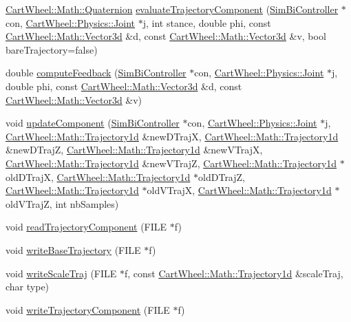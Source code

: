 \begin{DoxyCompactItemize}
\item 
\hyperlink{classCartWheel_1_1Math_1_1Quaternion}{CartWheel::Math::Quaternion} \hyperlink{classCartWheel_1_1Core_1_1TrajectoryComponent_afefb087422e56e30397225216fb2444a}{evaluateTrajectoryComponent} (\hyperlink{classCartWheel_1_1Core_1_1SimBiController}{SimBiController} $\ast$con, \hyperlink{classCartWheel_1_1Physics_1_1Joint}{CartWheel::Physics::Joint} $\ast$j, int stance, double phi, const \hyperlink{classCartWheel_1_1Math_1_1Vector3d}{CartWheel::Math::Vector3d} \&d, const \hyperlink{classCartWheel_1_1Math_1_1Vector3d}{CartWheel::Math::Vector3d} \&v, bool bareTrajectory=false)
\item 
double \hyperlink{classCartWheel_1_1Core_1_1TrajectoryComponent_a7708f478d9116878361a321bfb907558}{computeFeedback} (\hyperlink{classCartWheel_1_1Core_1_1SimBiController}{SimBiController} $\ast$con, \hyperlink{classCartWheel_1_1Physics_1_1Joint}{CartWheel::Physics::Joint} $\ast$j, double phi, const \hyperlink{classCartWheel_1_1Math_1_1Vector3d}{CartWheel::Math::Vector3d} \&d, const \hyperlink{classCartWheel_1_1Math_1_1Vector3d}{CartWheel::Math::Vector3d} \&v)
\item 
void \hyperlink{classCartWheel_1_1Core_1_1TrajectoryComponent_a3771a3d28d488a93d44f3bc71c1162b9}{updateComponent} (\hyperlink{classCartWheel_1_1Core_1_1SimBiController}{SimBiController} $\ast$con, \hyperlink{classCartWheel_1_1Physics_1_1Joint}{CartWheel::Physics::Joint} $\ast$j, \hyperlink{classCartWheel_1_1Math_1_1GenericTrajectory}{CartWheel::Math::Trajectory1d} \&newDTrajX, \hyperlink{classCartWheel_1_1Math_1_1GenericTrajectory}{CartWheel::Math::Trajectory1d} \&newDTrajZ, \hyperlink{classCartWheel_1_1Math_1_1GenericTrajectory}{CartWheel::Math::Trajectory1d} \&newVTrajX, \hyperlink{classCartWheel_1_1Math_1_1GenericTrajectory}{CartWheel::Math::Trajectory1d} \&newVTrajZ, \hyperlink{classCartWheel_1_1Math_1_1GenericTrajectory}{CartWheel::Math::Trajectory1d} $\ast$oldDTrajX, \hyperlink{classCartWheel_1_1Math_1_1GenericTrajectory}{CartWheel::Math::Trajectory1d} $\ast$oldDTrajZ, \hyperlink{classCartWheel_1_1Math_1_1GenericTrajectory}{CartWheel::Math::Trajectory1d} $\ast$oldVTrajX, \hyperlink{classCartWheel_1_1Math_1_1GenericTrajectory}{CartWheel::Math::Trajectory1d} $\ast$oldVTrajZ, int nbSamples)
\item 
void \hyperlink{classCartWheel_1_1Core_1_1TrajectoryComponent_ae6df1efc43d8cb573b3dfa0493e491cf}{readTrajectoryComponent} (FILE $\ast$f)
\item 
void \hyperlink{classCartWheel_1_1Core_1_1TrajectoryComponent_aeb954304d3c81830f2b543b159e889d7}{writeBaseTrajectory} (FILE $\ast$f)
\item 
void \hyperlink{classCartWheel_1_1Core_1_1TrajectoryComponent_aacd5934cf7ec5b1e6eb8c564cbec12b1}{writeScaleTraj} (FILE $\ast$f, const \hyperlink{classCartWheel_1_1Math_1_1GenericTrajectory}{CartWheel::Math::Trajectory1d} \&scaleTraj, char type)
\item 
void \hyperlink{classCartWheel_1_1Core_1_1TrajectoryComponent_a622bc55af66ccb0ba86f4e8d3b637c21}{writeTrajectoryComponent} (FILE $\ast$f)
\end{DoxyCompactItemize}
